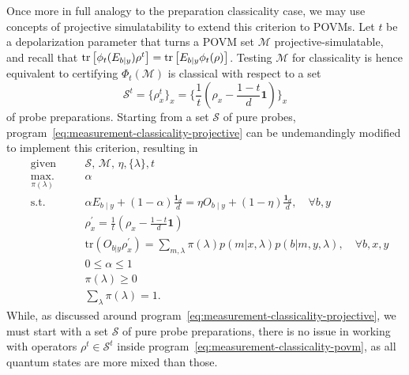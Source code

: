         Once more in full analogy to the preparation classicality case, we may use concepts of projective simulatability to extend this criterion to POVMs. Let $t$ be a depolarization parameter that turns a POVM set $\mathcal{M}$ projective-simulatable, and recall that $\text{tr}\left[  \phi_t( E_{b \mid y}) \rho^t  \right] = \text{tr}\left[  E_{b \mid y} \phi_t(\rho)  \right]$. Testing $\mathcal{M}$ for classicality is hence equivalent to certifying $\Phi_t \left( \mathcal{M} \right)$ is classical with respect to a set
        $$
            \mathcal{S}^t = \{ \rho_x^t \}_x = \Bigg\{ \frac{1}{t} \left( \rho_x - \frac{1-t}{d} \mathbf{1} \right) \Bigg\}_x
        $$
        of probe preparations. Starting from a set $\mathcal{S}$ of pure probes, program~\eqref{eq:measurement-classicality-projective} can be undemandingly modified to implement this criterion, resulting in
        \begin{subequations}
            \begin{alignat}{2}
                &\text{given}    &\quad & \mathcal{S},\, \mathcal{M},\, \eta, \{ \lambda \}, t \\
                &\underset{\pi(\lambda)}{\text{max.}}   &	  & \alpha \\
                &\text{s.t.}    &      & \alpha E_{b \mid y} + (1 - \alpha)\frac{\mathbf{1}_d}{d} = \eta O_{b \mid y} + \left( 1 - \eta \right) \frac{\mathbf{1}_d}{d}, \quad\forall b, y \\
                &                  &      & \rho_x^\prime = \frac{1}{t} \left( \rho_x - \frac{1-t}{d} \mathbf{1} \right) \\
                &                  &      & \text{tr}(O_{b \vert y} \rho_x^\prime) = \sum_{m, \lambda} \pi(\lambda) p(m \vert x, \lambda) p(b \vert m, y, \lambda), \quad\forall b, x, y \\
                &				   &	  & 0 \leq \alpha \leq 1 \\
                &				   &	  & \pi(\lambda) \geq 0 \\
                &				   &	  & \sum_\lambda \pi(\lambda) = 1 .
            \end{alignat}
            \label{eq:measurement-classicality-povm}
        \end{subequations}
        While, as discussed around program~\eqref{eq:measurement-classicality-projective}, we must start with a set $\mathcal{S}$ of pure probe preparations, there is no issue in working with operators $\rho^t \in \mathcal{S}^t$ inside program~\eqref{eq:measurement-classicality-povm}, as all quantum states are more mixed than those.

